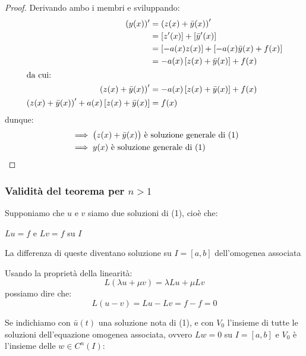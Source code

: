 \begin{proof}
    Derivando ambo i membri e sviluppando:
    \begin{align*}
        (y(x))'                                                                  & = \left( z(x) + \bar{y}(x) \right)'                               \\
                                                                                 & = [z'(x)] + [\bar{y}'(x)]                                         \\
                                                                                 & = \left[ -a(x)z(x) \right] + \left[ -a(x)\bar y(x) + f(x) \right] \\
                                                                                 & = -a(x) \left[ z(x) + \bar y(x) \right] +f(x)                     \\
        \intertext{da cui:}
        \left( z(x) + \bar{y}(x) \right)'                                        & = -a(x) \left[ z(x) + \bar y(x) \right] +f(x)                     \\
        \left( z(x) + \bar{y}(x) \right)' + a(x) \left[ z(x) + \bar y(x) \right] & = f(x)                                                            \\
    \end{align*}
    dunque:
    \begin{align*}
         & \implies \bigl\lparen z(x) + \bar{y}(x) \bigr\rparen \ \text{è soluzione generale di (1)} \\
         & \implies y(x) \ \text{è soluzione generale di (1)}
    \end{align*}

\end{proof}

\subsubsection*{Validità del teorema per \texorpdfstring{\(n>1\)}{n>1}}

Supponiamo che \(u\) e \(v\) siamo due soluzioni di (1), cioè che:

\(Lu=f\) e \(Lv=f\) su \(I\)

La differenza di queste diventano soluzione su \(I=[a,b]\) dell'omogenea associata

Usando la proprietà della linearità:
\[
    L(\lambda u+\mu v) = \lambda L u + \mu L v
\]
possiamo dire che:
\[
    L(u-v) = Lu-Lv = f- f=0
\]

Se indichiamo con \(\bar{u}(t)\) una soluzione nota di (1), e con \(V_0\) l'insieme di tutte le soluzioni dell'equazione omogenea associata, ovvero \(Lw=0\) su \(I=[a,b]\) e \(V_0\) è l'insieme delle \(w \in C^n(I)\):

